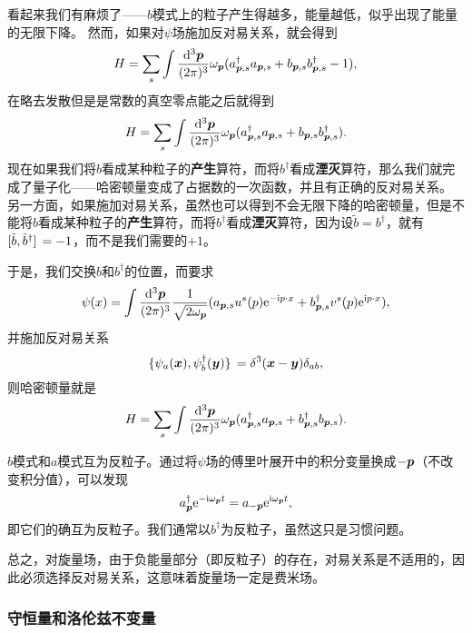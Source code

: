 \documentclass[hyperref, UTF8, a4paper]{ctexart}
\newcommand*{\ii}{\mathrm{i}}
\newcommand*{\ee}{\mathrm{e}}
\renewcommand{\emph}{\textbf}
\begin{document}
看起来我们有麻烦了——$b$模式上的粒子产生得越多，能量越低，似乎出现了能量的无限下降。
然而，如果对$\psi$场施加反对易关系，就会得到
\[
    H = \sum_{s} \int \frac{\dd[3]{\vb*{p}}}{(2\pi)^3} \omega_{\vb*{p}} (a^\dagger_{\vb*{p}, s} a_{\vb*{p}, s} + b_{\vb*{p}, s} b^\dagger_{\vb*{p}, s} - 1),
\]
在略去发散但是是常数的真空零点能之后就得到
\begin{equation}
    H = \sum_{s} \int \frac{\dd[3]{\vb*{p}}}{(2\pi)^3} \omega_{\vb*{p}} (a^\dagger_{\vb*{p}, s} a_{\vb*{p}, s} + b_{\vb*{p}, s} b^\dagger_{\vb*{p}, s} ).
\end{equation}
现在如果我们将$b$看成某种粒子的\emph{产生}算符，而将$b^\dagger$看成\emph{湮灭}算符，那么我们就完成了量子化——哈密顿量变成了占据数的一次函数，并且有正确的反对易关系。
另一方面，如果施加对易关系，虽然也可以得到不会无限下降的哈密顿量，但是不能将$b$看成某种粒子的\emph{产生}算符，而将$b^\dagger$看成\emph{湮灭}算符，因为设$\tilde{b} = b^\dagger$，就有$\comm*{\tilde{b}}{\tilde{b}^\dagger} = -1$，而不是我们需要的$+1$。

于是，我们交换$b$和$b^\dagger$的位置，而要求
\begin{equation}
    \psi(x) = \int \frac{\dd[3]{\vb*{p}}}{(2\pi)^3} \frac{1}{\sqrt{2 \omega_{\vb*{p}}}} (a_{\vb*{p}, s} u^s(p) \ee^{-\ii p \cdot x} + b^\dagger_{\vb*{p}, s} v^s(p) \ee^{\ii p \cdot x}),
\end{equation}
并施加反对易关系
\begin{equation}
    \acomm*{\psi_a(\vb*{x})}{\psi^\dagger_b(\vb*{y})} = \delta^3(\vb*{x} - \vb*{y}) \delta_{ab},
\end{equation}
则哈密顿量就是
\begin{equation}
    H = \sum_{s} \int \frac{\dd[3]{\vb*{p}}}{(2\pi)^3} \omega_{\vb*{p}} (a^\dagger_{\vb*{p}, s} a_{\vb*{p}, s} + b^\dagger_{\vb*{p}, s} b_{\vb*{p}, s} ).
\end{equation}

$b$模式和$a$模式互为反粒子。通过将$\psi$场的傅里叶展开中的积分变量换成$-\vb*{p}$（不改变积分值），可以发现
\[
    a^\dagger_{\vb*{p}} \ee^{- \ii \omega_{\vb*{p}} t} = a_{-\vb*{p}} \ee^{\ii \omega_{\vb*{p}} t},
\]
即它们的确互为反粒子。我们通常以$b^\dagger$为反粒子，虽然这只是习惯问题。

总之，对旋量场，由于负能量部分（即反粒子）的存在，对易关系是不适用的，因此必须选择反对易关系，这意味着旋量场一定是费米场。

\subsubsection{守恒量和洛伦兹不变量}
\end{document}
